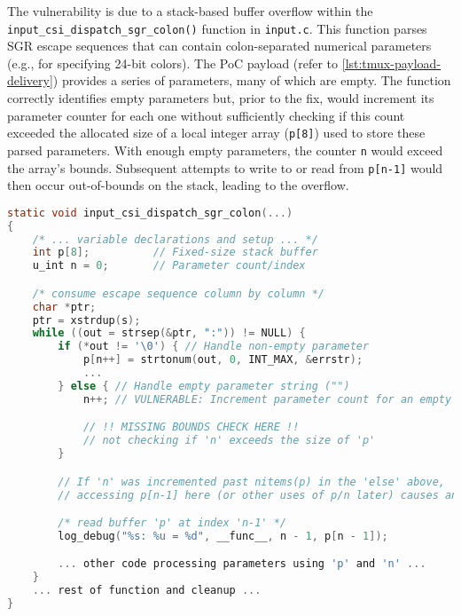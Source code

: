 The vulnerability is due to a stack-based buffer overflow within the \texttt{input\_csi\_dispatch\_sgr\_colon()} function in \texttt{input.c}. This function parses SGR escape sequences that can contain colon-separated numerical parameters (e.g., for specifying 24-bit colors). The PoC payload (refer to \autoref{lst:tmux-payload-delivery}) provides a series of parameters, many of which are empty. The function correctly identifies empty parameters but, prior to the fix, would increment its parameter counter for each one without sufficiently checking if this count exceeded the allocated size of a local integer array (\texttt{p[8]}) used to store these parsed parameters. With enough empty parameters, the counter \texttt{n} would exceed the array's bounds. Subsequent attempts to write to or read from \texttt{p[n-1]} would then occur out-of-bounds on the stack, leading to the overflow.

\begin{figure*}
	\begin{lstlisting}[language=C, caption=Vulnerable logic simplified: Stack buffer overflow in empty SGR parameter handling, label={lst:vulnerable-sgr-simplified}]
static void input_csi_dispatch_sgr_colon(...)
{
    /* ... variable declarations and setup ... */
    int p[8];          // Fixed-size stack buffer
    u_int n = 0;       // Parameter count/index

    /* consume escape sequence column by column */
    char *ptr;
    ptr = xstrdup(s);
    while ((out = strsep(&ptr, ":")) != NULL) {
        if (*out != '\0') { // Handle non-empty parameter
            p[n++] = strtonum(out, 0, INT_MAX, &errstr);
            ...
        } else { // Handle empty parameter string ("")
            n++; // VULNERABLE: Increment parameter count for an empty parameter

            // !! MISSING BOUNDS CHECK HERE !!
            // not checking if 'n' exceeds the size of 'p'
        }

        // If 'n' was incremented past nitems(p) in the 'else' above,
        // accessing p[n-1] here (or other uses of p/n later) causes an out-of-bounds access.

        /* read buffer 'p' at index 'n-1' */
        log_debug("%s: %u = %d", __func__, n - 1, p[n - 1]);

        ... other code processing parameters using 'p' and 'n' ...
    }
    ... rest of function and cleanup ...
}
\end{lstlisting}
\end{figure*}

